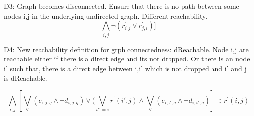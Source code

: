 D3:  Graph becomes disconnected. Ensure that there is no path between some nodes i,j in the underlying undirected graph. Different reachability.
\[ \bigwedge\limits_{i,j} \neg (r^{\prime}_{i,j} \lor r^{\prime}_{j,i})]  \]

D4: New reachability definition for grph connectedness: dReachable. Node i,j are reachable either if there is a direct edge and its not dropped. 
Or there is an node i' such that, there is a direct edge between i,i' which is not dropped and i' and j is dReachable.

\[ \bigwedge\limits_{i,j}  [\bigvee_{q} (e_{i,j,q} \land  \neg d_{i,j,q}) \lor  (\bigvee_{i' != i}  r^{\prime}(i',j) \land  \bigvee_{q} (e_{i,i',q} \land \neg d_{i,i',q}) ] \supset r^{\prime}(i,j)  \]



